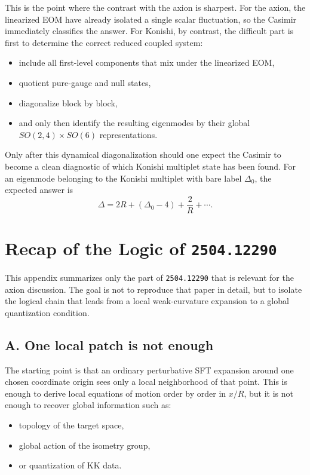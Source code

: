 \documentclass[12pt]{article}
\newcommand{\D}{\Delta}
\begin{document}
This is the point where the contrast with the axion is sharpest.  For the axion, the linearized EOM have
already isolated a single scalar fluctuation, so the Casimir immediately classifies the answer.  For
Konishi, by contrast, the difficult part is first to determine the correct reduced coupled system:
\begin{itemize}
\item include all first-level components that mix under the linearized EOM,
\item quotient pure-gauge and null states,
\item diagonalize block by block,
\item and only then identify the resulting eigenmodes by their global
      $SO(2,4)\times SO(6)$ representations.
\end{itemize}
Only after this dynamical diagonalization should one expect the Casimir to become a clean diagnostic of
which Konishi multiplet state has been found.  For an eigenmode belonging to the Konishi multiplet with
bare label $\D_0$, the expected answer is
\begin{equation}
\D=2R+(\D_0-4)+\frac{2}{R}+\cdots.
\end{equation}

\appendix

\section{Recap of the Logic of \texorpdfstring{\texttt{2504.12290}}{2504.12290}}

This appendix summarizes only the part of \texttt{2504.12290} that is relevant for the axion discussion.
The goal is not to reproduce that paper in detail, but to isolate the logical chain that leads from a
local weak-curvature expansion to a global quantization condition.

\subsection*{A. One local patch is not enough}

The starting point is that an ordinary perturbative SFT expansion around one chosen coordinate origin sees
only a local neighborhood of that point.  This is enough to derive local equations of motion order by
order in $x/R$, but it is not enough to recover global information such as:
\begin{itemize}
\item topology of the target space,
\item global action of the isometry group,
\item or quantization of KK data.
\end{itemize}
\end{document}
